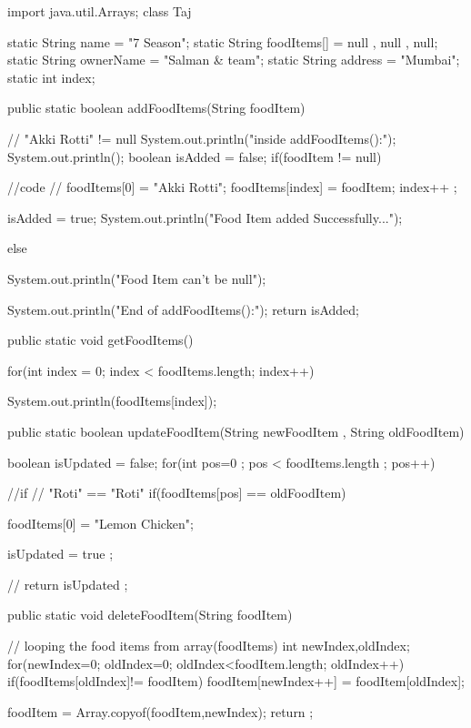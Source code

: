 import java.util.Arrays;
 class Taj{

    static String name = "7 Season";
    static String foodItems[] = {null , null , null};
    static String ownerName = "Salman & team";
    static String address = "Mumbai";
    static int index;
	
         

	public static boolean addFoodItems(String foodItem){
       // "Akki Rotti" != null
	    System.out.println("inside addFoodItems():");
        System.out.println();
		boolean isAdded = false;
		if(foodItem != null){
		//code
		     // foodItems[0] = "Akki Rotti";
			    foodItems[index] = foodItem;
				index++ ;
				
					isAdded = true;
					System.out.println("Food Item added Successfully...");
					}
					else
					{
					System.out.println("Food Item can't be null");
					
					}
					System.out.println("End of addFoodItems():");
				  return isAdded;
	}
		
    public static void getFoodItems(){
    for(int index = 0; index < foodItems.length; index++){
           System.out.println(foodItems[index]);

	}

  }
  
   public static boolean updateFoodItem(String newFoodItem , String oldFoodItem){
	  
	         boolean isUpdated = false;
		for(int pos=0 ; pos < foodItems.length ; pos++){

            //if			
			  // "Roti" == "Roti"
			   if(foodItems[pos] == oldFoodItem){
				  foodItems[0] = "Lemon Chicken";

                       isUpdated = true ;
			   
			   }
         
     
            }	
        }
           // return isUpdated ;
        
			public static void deleteFoodItem(String foodItem){
			
			// looping the food items from array(foodItems)
			int newIndex,oldIndex;
			for(newIndex=0; oldIndex=0; oldIndex<foodItem.length; oldIndex++){
			if(foodItems[oldIndex]!= foodItem){
			foodItem[newIndex++] = foodItem[oldIndex];
			}
	}

         foodItem = Array.copyof(foodItem,newIndex);
         return ;

      }
	  
 }			
	
